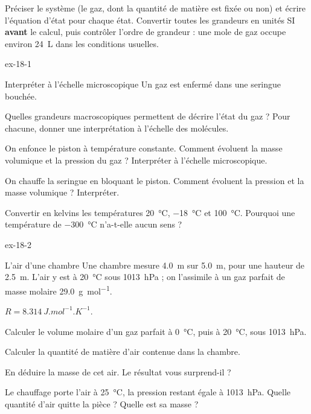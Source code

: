 \begin{rediger}
Préciser le système (le gaz, dont la quantité de matière est fixée ou non) et écrire l'équation d'état pour chaque état.
Convertir toutes les grandeurs en unités SI \textbf{avant} le calcul, puis contrôler l'ordre de grandeur : une mole de
gaz occupe environ \qty{24}{L} dans les conditions usuelles.
\end{rediger}
\exercices

\begin{blocLivre}{ex-18-1}
\begin{exercice}[1]{Interpréter à l'échelle microscopique}
Un gaz est enfermé dans une seringue bouchée.
\begin{questions}
\item Quelles grandeurs macroscopiques permettent de décrire l'état du gaz ? Pour chacune, donner une interprétation
à l'échelle des molécules.
\item On enfonce le piston à température constante. Comment évoluent la masse volumique et la pression du gaz ?
Interpréter à l'échelle microscopique.
\item On chauffe la seringue en bloquant le piston. Comment évoluent la pression et la masse volumique ? Interpréter.
\item Convertir en kelvins les températures \qty{20}{\degreeCelsius}, \qty{-18}{\degreeCelsius} et \qty{100}{\degreeCelsius}. Pourquoi une
température de \qty{-300}{\degreeCelsius} n'a-t-elle aucun sens ?
\end{questions}
\end{exercice}
\end{blocLivre}
\begin{blocLivre}{ex-18-2}
\begin{exercice}[1]{L'air d'une chambre}
Une chambre mesure \qty{4,0}{m} sur \qty{5,0}{m}, pour une hauteur de \qty{2,5}{m}. L'air y est à \qty{20}{\degreeCelsius}
sous \qty{1013}{hPa} ; on l'assimile à un gaz parfait de masse molaire \qty{29,0}{g.mol^{-1}}.
\begin{donnees}
$R=\qty{8,314}{J.mol^{-1}.K^{-1}}$.
\end{donnees}
\begin{questions}
\item Calculer le volume molaire d'un gaz parfait à \qty{0}{\degreeCelsius}, puis à \qty{20}{\degreeCelsius}, sous \qty{1013}{hPa}.
\item Calculer la quantité de matière d'air contenue dans la chambre.
\item En déduire la masse de cet air. Le résultat vous surprend-il ?
\item Le chauffage porte l'air à \qty{25}{\degreeCelsius}, la pression restant égale à \qty{1013}{hPa}. Quelle quantité d'air
quitte la pièce ? Quelle est sa masse ?
\end{questions}
\end{exercice}
\end{blocLivre}
